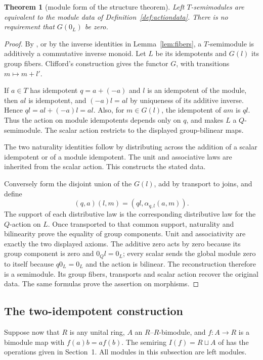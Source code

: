 \documentclass[11pt]{amsart}
\newtheorem{theorem}{Theorem}[section]
\theoremstyle{definition}
\theoremstyle{remark}
\begin{document}
\begin{theorem}[module form of the structure theorem]\label{thm:general}
Left $T$-semimodules are equivalent to the module data of Definition~\ref{def:actiondata}. There is no requirement that $G(0_L)$ be zero.
\end{theorem}
\begin{proof}
By \cite[Proposition~6.1]{FGJM}, or by the inverse identities in Lemma~\ref{lem:fibers}, a $T$-semimodule is additively a commutative inverse monoid. Let $L$ be its idempotents and $G(l)$ its group fibers. Clifford's construction gives the functor $G$, with transitions $m\mapsto m+l'$.

If $a\in T$ has idempotent $q=a+(-a)$ and $l$ is an idempotent of the module, then $al$ is idempotent, and $(-a)l=al$ by uniqueness of its additive inverse. Hence $ql=al+(-a)l=al$. Also, for $m\in G(l)$, the idempotent of $am$ is $q l$. Thus the action on module idempotents depends only on $q$, and makes $L$ a $Q$-semimodule. The scalar action restricts to the displayed group-bilinear maps.

The two naturality identities follow by distributing across the addition of a scalar idempotent or of a module idempotent. The unit and associative laws are inherited from the scalar action. This constructs the stated data.

Conversely form the disjoint union of the $G(l)$, add by transport to joins, and define
\[
 (q,a)(l,m)=(ql,\alpha_{q,l}(a,m)).
\]
The support of each distributive law is the corresponding distributive law for the $Q$-action on $L$. Once transported to that common support, naturality and bilinearity prove the equality of group components. Unit and associativity are exactly the two displayed axioms. The additive zero acts by zero because its group component is zero and $0_Q l=0_L$; every scalar sends the global module zero to itself because $q0_L=0_L$ and the action is bilinear. The reconstruction therefore is a semimodule. Its group fibers, transports and scalar action recover the original data. The same formulas prove the assertion on morphisms.
\end{proof}

\subsection{The two-idempotent construction}
Suppose now that $R$ is any unital ring, $A$ an $R$--$R$-bimodule, and $f:A\to R$ is a bimodule map with $f(a)b=af(b)$. The semiring $I(f)=R\sqcup A$ of \cite[Construction~3.5]{FGJM} has the operations given in Section~1. All modules in this subsection are left modules.
\end{document}
